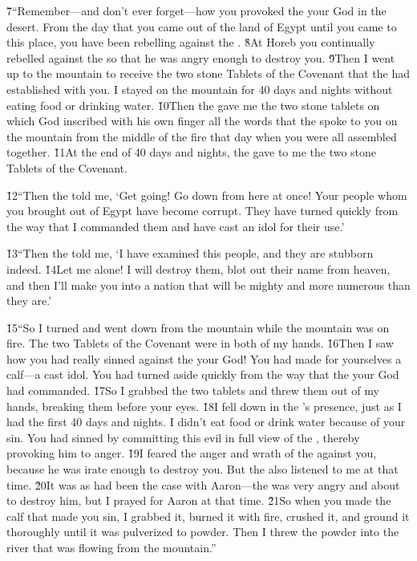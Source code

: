 \v{7}``Remember---and don't ever forget---how you provoked the  your God in the desert. From the day that you came out of the land of Egypt until you came to this place, you have been rebelling against the . \v{8}At Horeb you continually rebelled against the  so that he was angry enough to destroy you. \v{9}Then I went up to the mountain to receive the two stone Tablets of the Covenant that the  had established with you. I stayed on the mountain for 40 days and nights without eating food or drinking water. \v{10}Then the  gave me the two stone tablets on which God inscribed with his own finger all the words that the  spoke to you on the mountain from the middle of the fire that day when you were all assembled together. \v{11}At the end of 40 days and nights, the  gave to me the two stone Tablets of the Covenant.

\v{12}``Then the  told me, `Get going! Go down from here at once! Your people whom you brought out of Egypt have become corrupt. They have turned quickly from the way that I commanded them and have cast an idol for their use.'

\v{13}``Then the  told me, `I have examined this people, and they are stubborn indeed. \v{14}Let me alone! I will destroy them, blot out their name from heaven, and then I'll make you into a nation that will be mighty and more numerous than they are.'

\v{15}``So I turned and went down from the mountain while the mountain was on fire. The two Tablets of the Covenant were in both of my hands. \v{16}Then I saw how you had really sinned against the  your God! You had made for yourselves a calf---a cast idol. You had turned aside quickly from the way that the  your God had commanded. \v{17}So I grabbed the two tablets and threw them out of my hands, breaking them before your eyes. \v{18}I fell down in the 's presence, just as I had the first 40 days and nights. I didn't eat food or drink water because of your sin. You had sinned by committing this evil in full view of the , thereby provoking him to anger. \v{19}I feared the anger and wrath of the  against you, because he was irate enough to destroy you. But the  also listened to me at that time. \v{20}It was as had been the case with Aaron---the  was very angry and about to destroy him, but I prayed for Aaron at that time. \v{21}So when you made the calf that made you sin, I grabbed it, burned it with fire, crushed it, and ground it thoroughly until it was pulverized to powder. Then I threw the powder into the river that was flowing from the mountain.''

